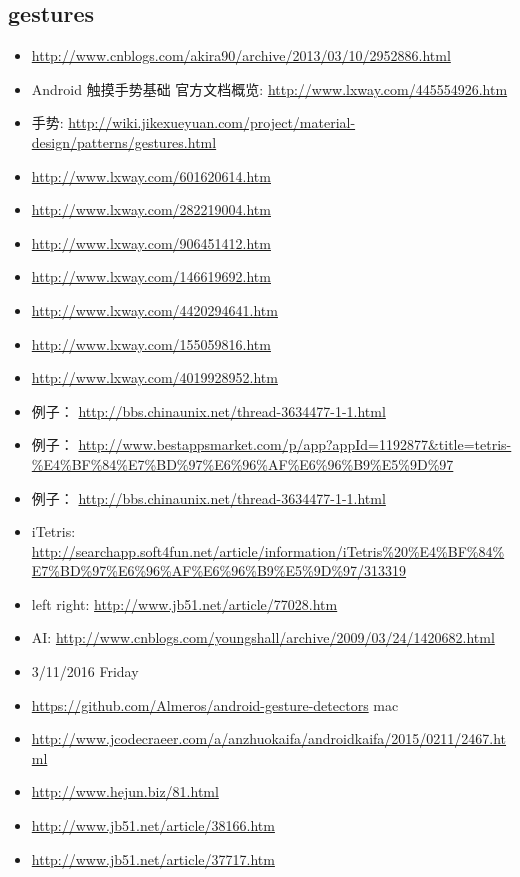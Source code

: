 \documentclass[9pt,b5paper]{article}
\begin{document}
\subsection{gestures}
\label{sec-2-7}
\begin{itemize}
\item \url{http://www.cnblogs.com/akira90/archive/2013/03/10/2952886.html}
\item Android 触摸手势基础 官方文档概览: \url{http://www.lxway.com/445554926.htm}
\item 手势: \url{http://wiki.jikexueyuan.com/project/material-design/patterns/gestures.html}
\item \url{http://www.lxway.com/601620614.htm}
\item \url{http://www.lxway.com/282219004.htm}
\item \url{http://www.lxway.com/906451412.htm}
\item \url{http://www.lxway.com/146619692.htm}
\item \url{http://www.lxway.com/4420294641.htm}
\item \url{http://www.lxway.com/155059816.htm}
\item \url{http://www.lxway.com/4019928952.htm}
\item 例子： \url{http://bbs.chinaunix.net/thread-3634477-1-1.html}
\item 例子： \url{http://www.bestappsmarket.com/p/app?appId=1192877&title=tetris-\%E4\%BF\%84\%E7\%BD\%97\%E6\%96\%AF\%E6\%96\%B9\%E5\%9D\%97}
\item 例子： \url{http://bbs.chinaunix.net/thread-3634477-1-1.html}
\item iTetris: \url{http://searchapp.soft4fun.net/article/information/iTetris\%20\%E4\%BF\%84\%E7\%BD\%97\%E6\%96\%AF\%E6\%96\%B9\%E5\%9D\%97/313319}
\item left right: \url{http://www.jb51.net/article/77028.htm}
\item AI: \url{http://www.cnblogs.com/youngshall/archive/2009/03/24/1420682.html}
\item 3/11/2016 Friday
\item \url{https://github.com/Almeros/android-gesture-detectors} mac
\item \url{http://www.jcodecraeer.com/a/anzhuokaifa/androidkaifa/2015/0211/2467.html}
\item \url{http://www.hejun.biz/81.html}
\item \url{http://www.jb51.net/article/38166.htm}
\item \url{http://www.jb51.net/article/37717.htm}

\end{itemize}
\end{document}
